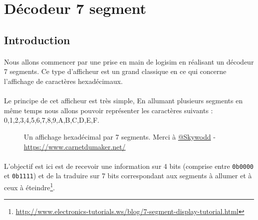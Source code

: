 \section{Décodeur 7 segment}
\subsection{Introduction}
\paragraph{}
Nous allons commencer par une prise en main de logisim en réalisant un décodeur 7 segments. Ce type d'afficheur est un grand classique en ce qui concerne l'affichage de caractères hexadécimaux.

\paragraph{}
Le principe de cet afficheur est très simple, En allumant plusieurs segments en même temps nous allons pouvoir représenter les caractères suivants :
0,1,2,3,4,5,6,7,8,9,A,B,C,D,E,F.

\begin{figure}[H]
	\caption{Un affichage hexadécimal par 7 segments. Merci à \href{https://twitter.com/skywodd}{@Skywodd} - \url{https://www.carnetdumaker.net/}}
\end{figure}

\paragraph{}
L'objectif est ici est de recevoir une information sur 4 bits (comprise entre \texttt{0b0000} et \texttt{0b1111}) et de la traduire sur 7 bits correspondant aux segments à allumer et à ceux à éteindre\footnote{\url{http://www.electronics-tutorials.ws/blog/7-segment-display-tutorial.html}}.

